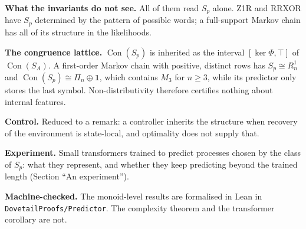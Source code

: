 \documentclass[11pt]{article}
\newcommand{\Con}{\operatorname{Con}}
\begin{document}
\medskip
\noindent\textbf{What the invariants do not see.}
All of them read $S_p$ alone.  Z1R and RRXOR have $S_p$ determined by
the pattern of possible words; a full-support Markov chain has all of
its structure in the likelihoods.

\medskip
\noindent\textbf{The congruence lattice.}
$\Con(S_p)$ is inherited as the interval $[\ker\Phi,\top]$ of
$\Con(S_A)$.  A first-order Markov chain with positive, distinct rows
has $S_p\cong R_n^1$ and $\Con(S_p)\cong\Pi_n\oplus\mathbf 1$, which
contains $M_3$ for $n\ge3$, while its predictor only stores the last
symbol.  Non-distributivity therefore certifies nothing about internal
features.

\medskip
\noindent\textbf{Control.}
Reduced to a remark: a controller inherits the structure when recovery
of the environment is state-local, and optimality does not supply that.

\medskip
\noindent\textbf{Experiment.}
Small transformers trained to predict processes chosen by the class of
$S_p$: what they represent, and whether they keep predicting beyond the
trained length (Section ``An experiment'').

\medskip
\noindent\textbf{Machine-checked.}
The monoid-level results are formalised in Lean in
\texttt{DovetailProofs/Predictor}.  The complexity theorem and the
transformer corollary are not.
\end{document}
